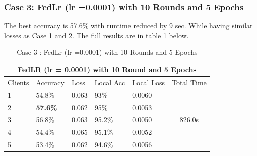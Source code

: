 \documentclass[conference]{IEEEtran}
\begin{document}
 \subsubsection{Case 3: FedLr (lr =0.0001) with 10 Rounds and 5 Epochs}
The best accuracy is 57.6\% with runtime reduced by 9 sec. While having similar losses as Case 1 and 2. The full results are in table \ref{lrlarge} below.
 \begin{table}[ht]
 	\centering
 	\caption{Case 3 : FedLr (lr =0.0001) with 10 Rounds and 5 Epochs}
 		\begin{tabular}{|lllllc|}
 			\hline
 			\multicolumn{6}{|c|}{FedLR (lr = 0.0001) with 10 Round and 5 Epochs}                                                                                                                            \\ \hline
 			\multicolumn{1}{|l|}{Clients} & \multicolumn{1}{l|}{Accuracy} & \multicolumn{1}{l|}{Loss}  & \multicolumn{1}{l|}{Local Acc} & \multicolumn{1}{l|}{Local Loss} & \multicolumn{1}{l|}{Total Time} \\ \hline
 			\multicolumn{1}{|l|}{1}       & \multicolumn{1}{l|}{54.8\%}   & \multicolumn{1}{l|}{0.063} & \multicolumn{1}{l|}{93\%}      & \multicolumn{1}{l|}{0.0060}     & \multirow{5}{*}{826.0s}         \\ \cline{1-5}
 			\multicolumn{1}{|l|}{2}       & \multicolumn{1}{l|}{\textbf{57.6\%}}   & \multicolumn{1}{l|}{0.062} & \multicolumn{1}{l|}{95\%}      & \multicolumn{1}{l|}{0.0053}     &                                 \\ \cline{1-5}
 			\multicolumn{1}{|l|}{3}       & \multicolumn{1}{l|}{56.8\%}   & \multicolumn{1}{l|}{0.063} & \multicolumn{1}{l|}{95.2\%}    & \multicolumn{1}{l|}{0.0050}     &                                 \\ \cline{1-5}
 			\multicolumn{1}{|l|}{4}       & \multicolumn{1}{l|}{54.4\%}   & \multicolumn{1}{l|}{0.065} & \multicolumn{1}{l|}{95.1\%}    & \multicolumn{1}{l|}{0.0052}     &                                 \\ \cline{1-5}
 			\multicolumn{1}{|l|}{5}       & \multicolumn{1}{l|}{53.4\%}   & \multicolumn{1}{l|}{0.062} & \multicolumn{1}{l|}{94.6\%}    & \multicolumn{1}{l|}{0.0056}     &                                 \\ \hline
 		\end{tabular}%
 		\label{lrlarge}
 \end{table}
\end{document}
